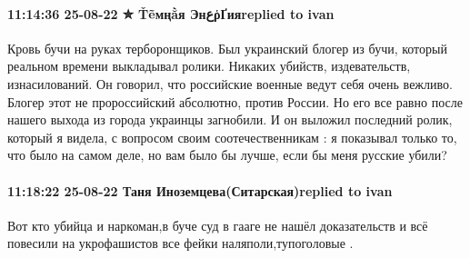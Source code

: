  
 
 
 
 

\paragraph{11:14:36 25-08-22 ✮ Ťẽмңằя ЭнعῥҐияreplied to ivan}

Кровь бучи на руках терборонщиков.
Был украинский блогер из бучи, который реальном времени выкладывал ролики. Никаких убийств, издевательств, изнасилований. Он говорил, что российские военные ведут себя очень вежливо. Блогер этот не пророссийский абсолютно, против России. Но его все равно после нашего выхода из города украинцы загнобили. И он выложил последний ролик, который я видела, с вопросом своим соотечественникам : я показывал только то, что было на самом деле, но вам было бы лучше, если бы меня русские убили?

\paragraph{11:18:22 25-08-22 Таня Иноземцева(Ситарская)replied to ivan}

Вот кто убийца и наркоман,в буче суд в гааге не нашёл доказательств и всё
повесили на укрофашистов все фейки наляполи,тупоголовые .
